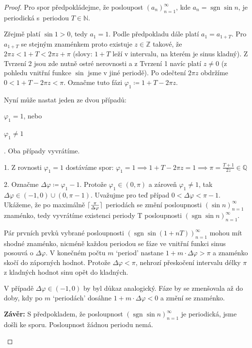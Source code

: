 \documentclass[a4paper]{article}
\DeclarePairedDelimiter\ceil{\lceil}{\rceil}
\DeclareMathOperator{\sgn}{sgn}
\begin{document}
\begin{proof}
    Pro spor předpokládejme, že posloupost $(a_n)^{\infty}_{n=1}$, kde $a_n = \sgn \sin n$, je periodická s~periodou $T \in \mathbb{N}$.

    Zřejmě platí $\sin 1 > 0$, tedy $a_1 = 1$. Podle předpokladu dále platí $a_1 = a_{1 + T}$. Pro $a_{1 + T}$ se stejným znaménkem proto existuje $z \in \mathbb{Z}$ takové, že ${2\pi z < 1 + T < 2\pi z + \pi}$ (slovy: $1 + T$ leží v intervalu, na kterém je sinus kladný). Z Tvrzení 2 jsou zde nutně ostré nerovnosti a z Tvrzení 1 navíc platí $z \neq 0$ (z pohledu vnitřní funkce $\sin$ jsme v jiné periodě). Po odečtení $2\pi z$ obdržíme $0 < 1 + T - 2\pi z < \pi$. Označme tuto fázi $\varphi_1 \coloneqq 1 + T - 2\pi z$.

    Nyní může nastat jeden ze dvou případů: \begin{inparaenum}
        \item $\varphi_1 = 1$,
        nebo
        \item $\varphi_1 \neq 1$
    \end{inparaenum}. Oba případy vyvrátíme.

    1. Z rovnosti $\varphi_1 = 1$ dostáváme spor:
    ${\varphi_1 = 1
                \implies 1 + T - 2\pi z = 1
                \implies \pi = \frac{T + 1}{2z} \in \mathbb{Q}}$

    2. Označme $\Delta \varphi \coloneqq \varphi_1 - 1$. Protože $\varphi_1 \in (0, \pi)$ a zároveň ${\varphi_1 \neq 1}$, tak ${\Delta \varphi \in (-1, 0) \cup (0, \pi - 1)}$. Uvažujme pro teď případ $0 < \Delta \varphi < \pi - 1$. Ukážeme, že po maximálně $\ceil{\frac{\pi}{\Delta \varphi}}$ periodách se změní posloupnosti $(\sin n)^{\infty}_{n=1}$ znaménko, tedy vyvrátíme existenci periody T posloupnosti $(\sgn \sin n)^{\infty}_{n=1}$.

    Pár prvních prvků vybrané posloupnosti $(\sgn \sin (1 + n T))^{\infty}_{n = 1}$ mohou mít shodné znaménko, nicméně každou periodou se fáze ve vnitřní funkci sinus posouvá o $\Delta \varphi$. V konečném počtu $m$ `period' nastane $1 + m \cdot \Delta \varphi > \pi$ a znaménko skočí do záporných hodnot. Protože $\Delta \varphi < \pi$, nehrozí přeskočení intervalu délky $\pi$ z kladných hodnot sinu opět do kladných.

    V případě $\Delta \varphi \in (-1, 0)$ by byl důkaz analogický. Fáze by se zmenšovala až do doby, kdy po $m$ `periodách' dosáhne $1 + m \cdot \Delta \varphi < 0$ a změní se znaménko.

    \textbf{Závěr:} S předpokladem, že posloupnost $(\sgn \sin n)^{\infty}_{n=1}$ je periodická, jsme došli ke sporu. Posloupnost žádnou periodu nemá.

    \begin{figure}[H]
        \centering
    \end{figure}
\end{proof}
\end{document}
